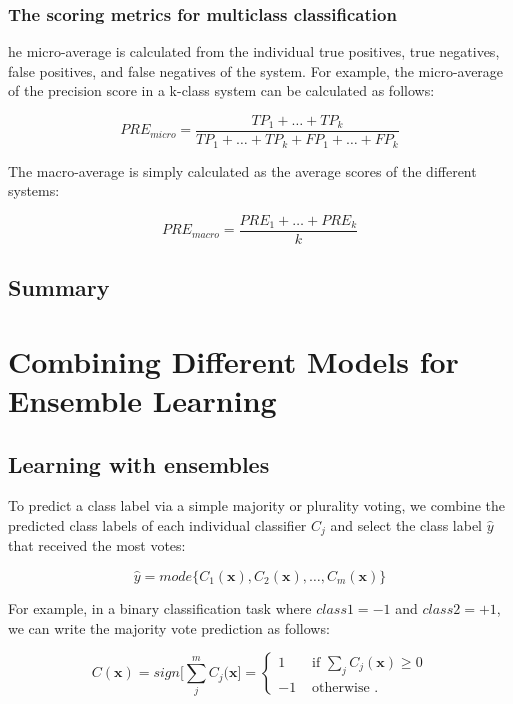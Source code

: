 \documentclass[letterpaper]{report}
\begin{document}
\subsection{The scoring metrics for multiclass classification}

he micro-average is calculated from the individual true positives, true negatives, false positives, and false negatives of the system. For example, the micro-average of the precision score in a k-class system can be calculated as follows:

\[
PRE_{micro} = \frac{TP_1 + \dots + TP_k}{TP_1 + \dots + TP_k + FP_1 + \dots + FP_k}
\]

The macro-average is simply calculated as the average scores of the different systems:

\[
PRE_{macro} = \frac{PRE_1 + \dots + PRE_k}{k}
\]

\section{Summary}





\chapter{Combining Different Models for Ensemble Learning}

\section{Learning with ensembles}

To predict a class label via a simple majority or plurality voting, we combine the predicted class labels of each individual classifier $C_j$ and select the class label $\hat{y}$ that received the most votes:

\[
\hat{y} = mode \{ C_1 (\mathbf{x}), C_2 (\mathbf{x}), \dots, C_m (\mathbf{x}) \}
\]

For example, in a binary classification task where $class1 = -1$ and $class2 = +1$, we can write the majority vote prediction as follows:

\[
C(\mathbf{x}) = sign \Bigg[ \sum_{j}^{m} C_j (\mathbf{x} \Bigg] = \begin{cases} 
      1 & \text{ if } \sum_j C_j (\mathbf{x}) \ge 0 \\
      -1 & \text{ otherwise }.
   \end{cases}
\]
\end{document}
